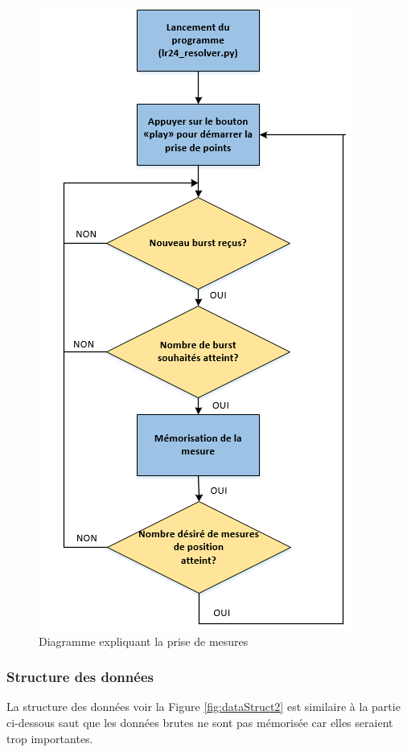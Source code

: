 \begin{figure}[htp]
	\begin{center}
		\includegraphics[scale=0.7]{figures/PriseMesures2.png}
		\caption{Diagramme expliquant la prise de mesures}
		\label{fig:mesures2} %
	\end{center}
\end{figure}

\subsubsection{Structure des données}
La structure des données voir la Figure \ref{fig:dataStruct2} est similaire à la partie ci-dessous saut que les données brutes ne sont pas mémorisée car elles seraient trop importantes. 

